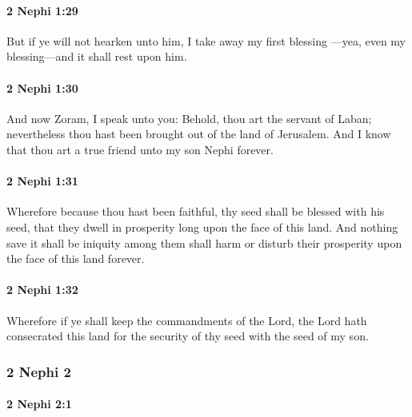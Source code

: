 		\paragraph{2 Nephi 1:29} %
			\label{2NEPHI-1-29}

			But if ye will not hearken unto him, I take away my first blessing
			---yea, even my blessing---and it shall rest upon him.

		\paragraph{2 Nephi 1:30} %
			\label{2NEPHI-1-30}

			And now Zoram, I speak unto you:
			Behold, thou art the servant of Laban;
			nevertheless thou hast been brought out of the land of Jerusalem.
			And I know that thou art a true friend unto my son Nephi forever.

		\paragraph{2 Nephi 1:31} %
			\label{2NEPHI-1-31}

			Wherefore because thou hast been faithful,
			thy seed shall be blessed with his seed,
			that they dwell in prosperity long upon the face of this land.
			And nothing save it shall be iniquity among them
			shall harm or disturb their prosperity upon the face of this land forever.

		\paragraph{2 Nephi 1:32} %
			\label{2NEPHI-1-32}

			Wherefore if ye shall keep the commandments of the Lord,
			the Lord hath consecrated this land for the security of thy seed
			with the seed of my son.

	\subsubsection{2 Nephi 2}
		\label{2NEPHI-2}
		
		\paragraph{2 Nephi 2:1} %
			\label{2NEPHI-2-1}

